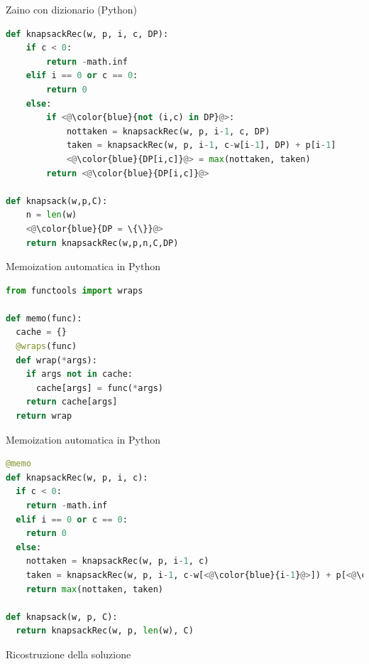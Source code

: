 \begin{frame}[fragile,shrink=5]{Zaino con dizionario (Python)}

\vspace{-9pt}
\begin{lstlisting}[language=python,tabsize=2]
def knapsackRec(w, p, i, c, DP):
	if c < 0:
		return -math.inf
	elif i == 0 or c == 0:
		return 0
	else:
		if <@\color{blue}{not (i,c) in DP}@>:
			nottaken = knapsackRec(w, p, i-1, c, DP)
			taken = knapsackRec(w, p, i-1, c-w[i-1], DP) + p[i-1]
			<@\color{blue}{DP[i,c]}@> = max(nottaken, taken)
		return <@\color{blue}{DP[i,c]}@>

def knapsack(w,p,C):
	n = len(w)
	<@\color{blue}{DP = \{\}}@>
	return knapsackRec(w,p,n,C,DP)
\end{lstlisting}

\end{frame}

\begin{frame}[fragile]{Memoization automatica in Python}

\vspace{-9pt}
\begin{lstlisting}[language=python]
from functools import wraps

def memo(func):
  cache = {}
  @wraps(func)
  def wrap(*args):
    if args not in cache:
      cache[args] = func(*args)
    return cache[args]
  return wrap
\end{lstlisting}


\end{frame}

\begin{frame}[fragile]{Memoization automatica in Python}

\vspace{-9pt}
\begin{lstlisting}[language=python]
@memo
def knapsackRec(w, p, i, c):
  if c < 0:
    return -math.inf
  elif i == 0 or c == 0:
    return 0
  else:
    nottaken = knapsackRec(w, p, i-1, c)
    taken = knapsackRec(w, p, i-1, c-w[<@\color{blue}{i-1}@>]) + p[<@\color{blue}{i-1}@>]
    return max(nottaken, taken) 

def knapsack(w, p, C):
  return knapsackRec(w, p, len(w), C)

\end{lstlisting}



\end{frame}


\begin{frame}{Ricostruzione della soluzione}

\vspace{-9pt}

\end{frame}

